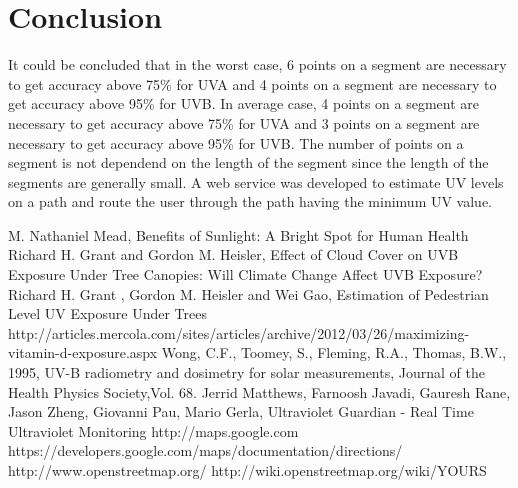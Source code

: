 \documentclass[12pt,fullpage,doublespace]{article}
\begin{document}
\section{Conclusion}
It could be concluded that in the worst case, 6 points on a segment are necessary to get accuracy above 75\% for UVA and 4 points on a segment are necessary to get accuracy above 95\% for UVB. In average case, 4 points on a segment are necessary to get accuracy above 75\% for UVA and  3 points on a segment are necessary to get accuracy above 95\% for UVB. The number of points on a segment is not dependend on the length of the segment since the length of the segments are generally small. A web service was developed to estimate UV levels on a path and route the user through the path having the minimum UV value.

\newpage
\begin{thebibliography}{6}
 M. Nathaniel Mead, Benefits of Sunlight: A Bright Spot for Human Health
 Richard H. Grant and Gordon M. Heisler, Effect of Cloud Cover on UVB Exposure Under Tree Canopies: Will Climate Change Affect UVB Exposure? 
Richard H. Grant , Gordon M. Heisler and Wei Gao, Estimation of Pedestrian Level UV Exposure Under Trees
 http://articles.mercola.com/sites/articles/archive/2012/03/26/maximizing-vitamin-d-exposure.aspx
 Wong, C.F., Toomey, S., Fleming, R.A., Thomas, B.W., 1995, UV-B radiometry and dosimetry for solar measurements, Journal of the Health Physics Society,Vol. 68.
Jerrid Matthews, Farnoosh Javadi, Gauresh Rane, Jason Zheng, Giovanni Pau, Mario Gerla, Ultraviolet Guardian - Real Time Ultraviolet Monitoring
 http://maps.google.com
https://developers.google.com/maps/documentation/directions/
http://www.openstreetmap.org/
http://wiki.openstreetmap.org/wiki/YOURS

\end{thebibliography}
\end{document}
